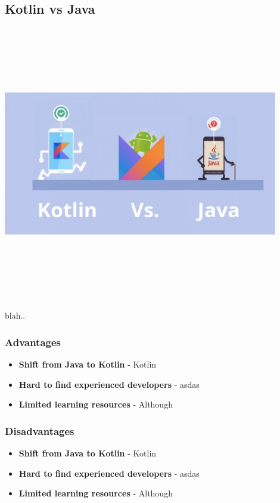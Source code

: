 \subsection{Kotlin vs Java}
\par
\medskip
\begin{center}
    \includegraphics[width=12cm,height=12cm,keepaspectratio]{Images/KotlinvJava.jpg}
\end{center}

blah..


\subsubsection{Advantages}
\begin{itemize}
    \item \textbf{Shift from Java to Kotlin} - Kotlin
    \item \textbf{Hard to find experienced developers} - asdas
    \item \textbf{Limited learning resources} - Although
\end{itemize}
\subsubsection{Disadvantages}
\begin{itemize}
    \item \textbf{Shift from Java to Kotlin} - Kotlin
    \item \textbf{Hard to find experienced developers} - asdas
    \item \textbf{Limited learning resources} - Although
\end{itemize}

